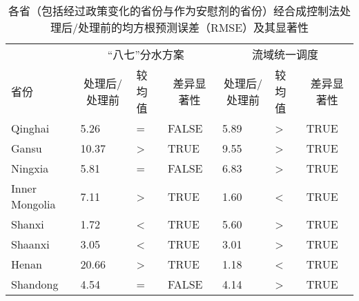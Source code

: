 
\begin{table}[!htbp]\footnotesize
	\centering
	\caption[合成控制法的安慰剂检验结果]{各省（包括经过政策变化的省份与作为安慰剂的省份）经合成控制法处理后/处理前的均方根预测误差（RMSE）及其显著性}
	\begin{tabularx}{0.8\textwidth}{XXXXXXX}
	  \toprule
			& \multicolumn{3}{c}{“八七”分水方案} & \multicolumn{3}{c}{流域统一调度} \\
  \cmidrule{2-7}    省份  & \multicolumn{1}{c}{处理后/处理前} & 较均值 & \multicolumn{1}{c}{差异显著性} & \multicolumn{1}{c}{处理后/处理前} & 较均值   & \multicolumn{1}{c}{差异显著性} \\
	  \midrule
	  Qinghai & 5.26  & =     & FALSE & 5.89  & >     & TRUE \\
	  Gansu & 10.37  & >     & TRUE  & 9.55  & >     & TRUE \\
	  Ningxia & 5.81  & =     & FALSE & 6.83  & >     & TRUE \\
	  Inner Mongolia & 7.11  & >     & TRUE  & 1.60  & <     & TRUE \\
	  Shanxi & 1.72  & <     & TRUE  & 5.60  & >     & TRUE \\
	  Shaanxi & 3.05  & <     & TRUE  & 3.01  & >     & TRUE \\
	  Henan & 20.66  & >     & TRUE  & 1.18  & <     & TRUE \\
	  Shandong & 4.54  & =     & FALSE & 4.14  & >     & TRUE \\
	  \bottomrule
	  \end{tabularx}%
	\label{ch5:tab:RMSE}%
\end{table}%
